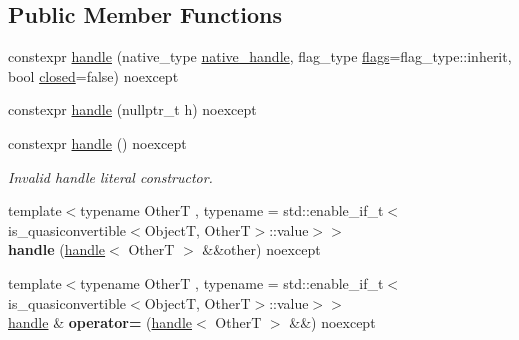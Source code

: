 \subsection*{Public Member Functions}
\begin{DoxyCompactItemize}
\item 
constexpr \mbox{\hyperlink{classdistant_1_1handle_a62c90d8be9b15cce2e0ec0ac85aab687}{handle}} (native\+\_\+type \mbox{\hyperlink{classdistant_1_1detail_1_1handle__base_a3207e125c17f2ebb59cab614083f782b}{native\+\_\+handle}}, flag\+\_\+type \mbox{\hyperlink{classdistant_1_1detail_1_1handle__base_adc97dc91543d76d0b89f43fee5f5f26b}{flags}}=flag\+\_\+type\+::inherit, bool \mbox{\hyperlink{classdistant_1_1detail_1_1handle__base_abd5ad44b32fda79418c5faada682336a}{closed}}=false) noexcept
\item 
constexpr \mbox{\hyperlink{classdistant_1_1handle_af2f4a42da3e2c88b0593cefa439e20ed}{handle}} (nullptr\+\_\+t h) noexcept
\item 
\mbox{\label{classdistant_1_1handle_a05cdf625487c59ffdfee11470fad5d41}} 
constexpr \mbox{\hyperlink{classdistant_1_1handle_a05cdf625487c59ffdfee11470fad5d41}{handle}} () noexcept
\begin{DoxyCompactList}\small\item\em Invalid handle literal constructor. \end{DoxyCompactList}\item 
\mbox{\label{classdistant_1_1handle_ae4a3ee70142af4ac84eab8542e4cac17}} 
{\footnotesize template$<$typename OtherT , typename  = std\+::enable\+\_\+if\+\_\+t$<$is\+\_\+quasiconvertible$<$\+Object\+T, Other\+T$>$\+::value$>$$>$ }\\{\bfseries handle} (\mbox{\hyperlink{classdistant_1_1handle}{handle}}$<$ OtherT $>$ \&\&other) noexcept
\item 
\mbox{\label{classdistant_1_1handle_a4d6d2690a64a8105236d236168f60f1c}} 
{\footnotesize template$<$typename OtherT , typename  = std\+::enable\+\_\+if\+\_\+t$<$is\+\_\+quasiconvertible$<$\+Object\+T, Other\+T$>$\+::value$>$$>$ }\\\mbox{\hyperlink{classdistant_1_1handle}{handle}} \& {\bfseries operator=} (\mbox{\hyperlink{classdistant_1_1handle}{handle}}$<$ OtherT $>$ \&\&) noexcept
\item 
\mbox{\label{classdistant_1_1handle_a1aeeca85db91bd5c1596f2c79680315f}} 

\end{DoxyCompactItemize}
